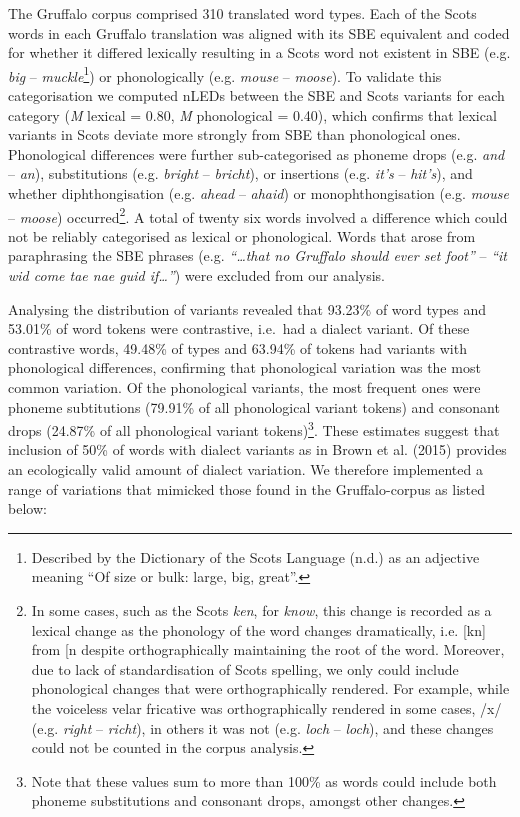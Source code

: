 \documentclass[doc,floatsintext]{apa6}
\let\rmarkdownfootnote\footnote%
\def\footnote{\protect\rmarkdownfootnote}
\begin{document}
The Gruffalo corpus comprised 310 translated word types. Each of the
Scots words in each Gruffalo translation was aligned with its SBE
equivalent and coded for whether it differed lexically resulting in a
Scots word not existent in SBE (e.g. \emph{big} --
\emph{muckle}\footnote{Described by the Dictionary of the Scots Language
  (n.d.) as an adjective meaning \enquote{Of size or bulk: large, big,
  great}.}) or phonologically (e.g. \emph{mouse} -- \emph{moose}). To
validate this categorisation we computed nLEDs between the SBE and Scots
variants for each category (\emph{M} lexical = 0.80, \emph{M}
phonological = 0.40), which confirms that lexical variants in Scots
deviate more strongly from SBE than phonological ones. Phonological
differences were further sub-categorised as phoneme drops (e.g.
\emph{and} -- \emph{an}), substitutions (e.g. \emph{bright} --
\emph{bricht}), or insertions (e.g. \emph{it's} -- \emph{hit's}), and
whether diphthongisation (e.g. \emph{ahead} -- \emph{ahaid}) or
monophthongisation (e.g. \emph{mouse} -- \emph{moose})
occurred\footnote{In some cases, such as the Scots \emph{ken}, for
  \emph{know}, this change is recorded as a lexical change as the
  phonology of the word changes dramatically, i.e. {[}kn{]}
  from {[}n\textipa{U}{]} despite orthographically
  maintaining the root of the word. Moreover, due to lack of
  standardisation of Scots spelling, we only could include phonological
  changes that were orthographically rendered. For example, while the
  voiceless velar fricative was orthographically rendered in some cases,
  /x/ (e.g. \emph{right} -- \emph{richt}), in others it was not (e.g.
  \emph{loch} -- \emph{loch}), and these changes could not be counted in
  the corpus analysis.}. A total of twenty six words involved a
difference which could not be reliably categorised as lexical or
phonological. Words that arose from paraphrasing the SBE phrases (e.g.
\emph{\enquote{\ldots{}that no Gruffalo should ever set foot}} --
\emph{\enquote{it wid come tae nae guid if\ldots{}}}) were excluded from
our analysis.

Analysing the distribution of variants revealed that 93.23\% of word
types and 53.01\% of word tokens were contrastive, i.e.~had a dialect
variant. Of these contrastive words, 49.48\% of types and 63.94\% of
tokens had variants with phonological differences, confirming that
phonological variation was the most common variation. Of the
phonological variants, the most frequent ones were phoneme subtitutions
(79.91\% of all phonological variant tokens) and consonant drops
(24.87\% of all phonological variant tokens)\footnote{Note that these
  values sum to more than 100\% as words could include both phoneme
  substitutions and consonant drops, amongst other changes.}. These
estimates suggest that inclusion of 50\% of words with dialect variants
as in Brown et al. (2015) provides an ecologically valid amount of
dialect variation. We therefore implemented a range of variations that
mimicked those found in the Gruffalo-corpus as listed below:
\end{document}
